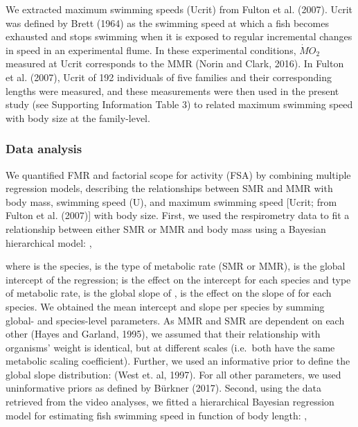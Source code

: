 \documentclass[12pt,a4paper]{article}
\begin{document}
\noindent We extracted maximum swimming speeds (Ucrit) from Fulton et
al. (2007). Ucrit was defined by Brett (1964) as the swimming speed at
which a fish becomes exhausted and stops swimming when it is exposed to
regular incremental changes in speed in an experimental flume. In these
experimental conditions, \(\dot{M}O_{2}\)measured at Ucrit corresponds
to the MMR (Norin and Clark, 2016). In Fulton et al. (2007), Ucrit of
192 individuals of five families and their corresponding lengths were
measured, and these measurements were then used in the present study
(see Supporting Information Table 3) to related maximum swimming speed
with body size at the family-level.

\hypertarget{data-analysis}{%
\subsubsection{Data analysis}\label{data-analysis}}

\noindent We quantified FMR and factorial scope for activity (FSA) by
combining multiple regression models, describing the relationships
between SMR and MMR with body mass, swimming speed (U), and maximum
swimming speed {[}Ucrit; from Fulton et al. (2007){]} with body size.
First, we used the respirometry data to fit a relationship between
either SMR or MMR and body mass using a Bayesian hierarchical model: ,

\noindent where is the species, is the type of metabolic rate (SMR or
MMR), is the global intercept of the regression; is the effect on the
intercept for each species and type of metabolic rate, is the global
slope of , is the effect on the slope of for each species. We obtained
the mean intercept and slope per species by summing global- and
species-level parameters. As MMR and SMR are dependent on each other
(Hayes and Garland, 1995), we assumed that their relationship with
organisms' weight is identical, but at different scales (i.e.~both have
the same metabolic scaling coefficient). Further, we used an informative
prior to define the global slope distribution: (West et. al, 1997). For
all other parameters, we used uninformative priors as defined by Bürkner
(2017). Second, using the data retrieved from the video analyses, we
fitted a hierarchical Bayesian regression model for estimating fish
swimming speed in function of body length: ,
\end{document}
